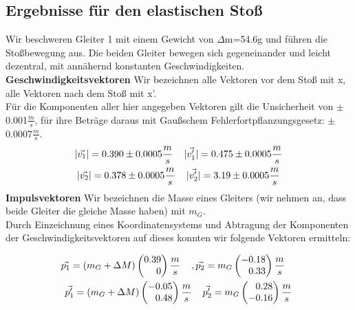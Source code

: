 \documentclass{article}
\begin{document}
\subsection{Ergebnisse für den elastischen Stoß}

Wir beschweren Gleiter 1 mit einem Gewicht von $\Delta$m=54.6g und führen die Stoßbewegung aus. Die beiden Gleiter bewegen sich gegeneinander und leicht dezentral, mit annähernd konstanten Geschwindigkeiten. \\

\textbf{Geschwindigkeitsvektoren}
Wir bezeichnen alle Vektoren vor dem Stoß mit x, alle Vektoren nach dem Stoß mit x'. \\
Für die Komponenten aller hier angegeben Vektoren gilt die Unsicherheit von $\pm$0.001$\frac{m}{s}$, für ihre Beträge daraus mit Gaußschem Fehlerfortpflanzungsgesetz: $\pm$0.0007$\frac{m}{s}$.
\begin{gather}
|\vec{v_1}|=0.390 \pm 0.0005 \frac{m}{s} \hspace{0.4cm}
|\vec{v_1'}|=0.475 \pm 0.0005 \frac{m}{s}
\\
|\vec{v_2}|=0.378 \pm 0.0005 \frac{m}{s} \hspace{0.4cm}
|\vec{v_2'}|=3.19 \pm 0.0005 \frac{m}{s}
\end{gather}
\textbf{Impulsvektoren}
Wir bezeichnen die Masse eines Gleiters (wir nehmen an, dass beide Gleiter die gleiche Masse haben) mit $m_G$. \\
Durch Einzeichnung eines Koordinatensystems und Abtragung der Komponenten der Geschwindigkeitsvektoren auf dieses konnten wir folgende Vektoren ermitteln:
\begin{center}


\begin{gather*}
\vec{p_1}=(m_G+\Delta M)
\begin{pmatrix*}[r]
0.39 \\ 0
\end{pmatrix*}\frac{m}{s} \hspace{0.4cm}
, \vec{p_2}= 
m_G\begin{pmatrix*}[r]
-0.18 \\ 0.33
\end{pmatrix*}\frac{m}{s}\hspace{0.4cm}
\\
\vec{p_1'}=
(m_G+\Delta M)\begin{pmatrix*}[r]
-0.05 \\ 0.48
\end{pmatrix*} \frac{m}{s}\hspace{0.4cm}
\vec{p_2'}=m_G\begin{pmatrix*}[r]
0.28 \\ -0.16
\end{pmatrix*} \frac{m}{s}
\end{gather*}
\end{center}
\end{document}
